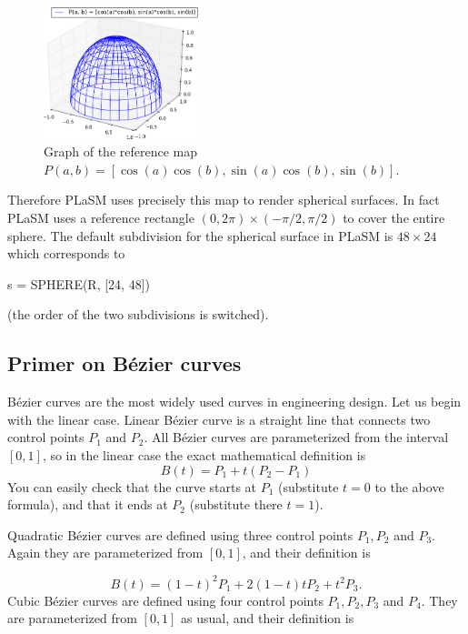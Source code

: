 \begin{figure}[!ht]
\begin{center}
\includegraphics[width=0.4\textwidth]{img/paramsu8.png}
\end{center}
\vspace{-6mm}
\caption{Graph of the reference map $P(a, b) = \left[\cos(a)\cos(b), \sin(a)\cos(b), \sin(b)\right]$.}
\label{fig:paramsu8}
\vspace{-1cm}
\end{figure}
\newpage
\noindent
Therefore PLaSM uses precisely this map to 
render spherical surfaces. In fact PLaSM uses a reference rectangle $(0, 2\pi)\times(-\pi/2, \pi/2)$
to cover the entire sphere. The default subdivision for the spherical surface in PLaSM
is $48 \times 24$ which corresponds to

\begin{bluecode}
s = SPHERE(R, [24, 48])
\end{bluecode}
(the order of the two subdivisions is switched).
\subsection{Primer on B\'ezier curves}

B\'ezier curves are the most widely used curves in engineering design. 
Let us begin with the linear case. Linear B\'ezier curve is a straight line that
connects two control points $P_1$ and $P_2$. All B\'ezier curves are parameterized
from the interval $[0, 1]$, so in the linear case the exact mathematical definition is
$$
  B(t) = P_1 + t(P_2 - P_1)
$$ 
You can easily check that the curve starts at $P_1$ (substitute $t = 0$ to the above formula),
and that it ends at $P_2$ (substitute there $t = 1$).

Quadratic B\'ezier curves are defined using three control points $P_1, P_2$ and $P_3$. Again they are
parameterized from $[0, 1]$, and their definition is

$$
  B(t) = (1 - t)^2 P_1 + 2(1 - t)t P_2 + t^2 P_3.
$$ 
Cubic B\'ezier curves are defined using four control points $P_1, P_2, P_3$ and $P_4$. They are
parameterized from $[0, 1]$ as usual, and their definition is

